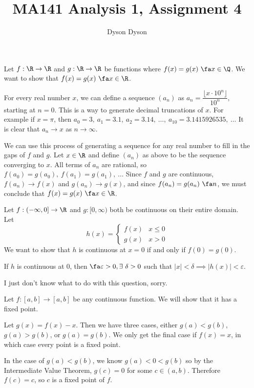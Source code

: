 \documentclass[a4paper]{article}
\title{MA141 Analysis 1, Assignment 4}
\author{Dyson Dyson}
\date{}
\begin{document}
\maketitle

\setlength{\parindent}{0em}
\setlength{\parskip}{1em}


Let $f : \R \to \R$ and $g : \R \to \R$ be functions where $f(x) = g(x)\ \fa x \in \Q$. We want to show that $f(x) = g(x)\ \fa x \in \R$.

For every real number $x$, we can define a sequence $(a_n)$ as $a_n = \dfrac{\lfloor x \cdot 10^n \rfloor}{10^n}$, starting at $n=0$. This is a way to generate decimal truncations of $x$. For example if $x = \pi$, then $a_0 = 3,\ a_1 = 3.1,\ a_2 = 3.14,\ \ldots,\ a_{10} = 3.1415926535,\ \ldots$ It is clear that $a_n \to x$ as $n \to \infty$.

We can use this process of generating a sequence for any real number to fill in the gaps of $f$ and $g$. Let $x \in \R$ and define $(a_n)$ as above to be the sequence converging to $x$. All terms of $a_n$ are rational, so $f(a_0) = g(a_0),\ f(a_1) = g(a_1),\ \ldots$ Since $f$ and $g$ are continuous, $f(a_n) \to f(x)$ and $g(a_n) \to g(x)$, and since $f(a_n) = g(a_n)\ \fa n$, we must conclude that $f(x) = g(x)\ \fa x \in \R$.


Let $f : (-\infty, 0] \to \R$ and $g : [0, \infty)$ both be continuous on their entire domain. Let $$h(x) = \begin{cases}
	f(x) & x \le 0\\
	g(x) & x > 0
\end{cases}$$We want to show that $h$ is continuous at $x=0$ if and only if $f(0) = g(0)$.

If $h$ is continuous at 0, then $\fa \varepsilon > 0, \exists\ \delta > 0$ such that $|x| < \delta \implies |h(x)| < \varepsilon$.

I just don't know what to do with this question, sorry.


Let $f : [a, b] \to [a, b]$ be any continuous function. We will show that it has a fixed point.

Let $g(x) = f(x) - x$. Then we have three cases, either $g(a) < g(b)$, $g(a) > g(b)$, or $g(a) = g(b)$. We only get the final case if $f(x) = x$, in which case every point is a fixed point.

In the case of $g(a) < g(b)$, we know $g(a) < 0 < g(b)$
so by the Intermediate Value Theorem, $g(c) = 0$ for some $c \in (a, b)$. Therefore $f(c) = c$, so $c$ is a fixed point of $f$.
\end{document}
